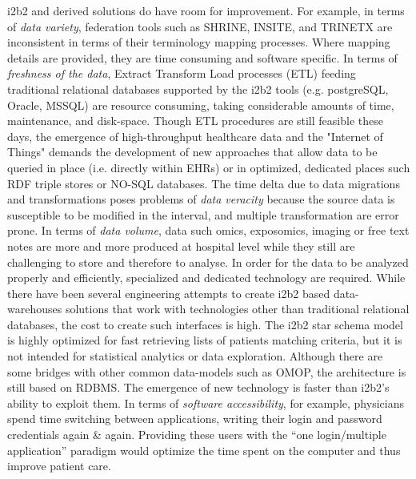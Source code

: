 \documentclass{amia}
\begin{document}
i2b2 and derived solutions do have room for improvement. For example, in terms of \textit{data variety}, federation tools such as SHRINE, INSITE, and TRINETX are inconsistent in terms of their terminology mapping processes\cite{ehr4crlesson}. Where mapping details are provided\cite{McMurry_2013}, they are time consuming and software specific\cite{Wynden__2010}. In terms of \textit{freshness of the data}, Extract Transform Load processes (ETL) feeding traditional relational databases supported by the i2b2 tools (e.g. postgreSQL, Oracle, MSSQL) are resource consuming, taking considerable amounts of time, maintenance, and disk-space. Though ETL procedures are still feasible these days, the emergence of high-throughput healthcare data and the "Internet of Things" demands the development of new approaches that allow data to be queried in place (i.e. directly within EHRs) or in optimized, dedicated places such RDF triple stores or NO-SQL databases. The time delta due to data migrations and transformations poses problems of \textit{data veracity} because the source data is susceptible to be modified in the interval, and multiple transformation are error prone.  In terms of \textit{data volume}, data such omics, exposomics, imaging or free text notes are more and more produced at hospital level while they still are challenging to store and therefore to analyse. In order for the data to be analyzed properly and efficiently, specialized and dedicated technology are required. While there have been several engineering attempts to create i2b2 based data-warehouses solutions that work with technologies other than traditional relational databases\cite{Wang2014}, the cost to create such interfaces is high. The i2b2 star schema model is highly optimized for fast retrieving lists of patients matching criteria, but it is not intended for statistical analytics or data exploration\cite{pmid27577447}. Although there are some bridges with other common data-models such as OMOP, the architecture is still based on RDBMS\cite{Klann_2016}. The emergence of new technology is faster than i2b2's ability to exploit them. In terms of \textit{software accessibility}, for example, physicians spend time switching between applications, writing their login and password credentials again \& again. Providing these users with the ``one login/multiple application'' paradigm would optimize the time spent on the computer and thus improve patient care.  
\end{document}
